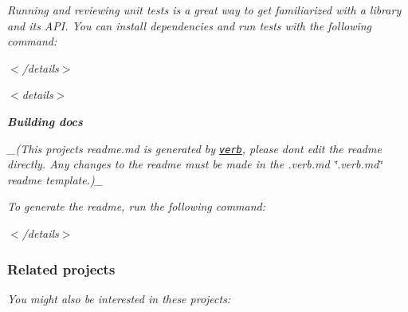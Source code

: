 {\itshape }

{\itshape Running and reviewing unit tests is a great way to get familiarized with a library and its A\+PI. You can install dependencies and run tests with the following command\+:}

{\itshape 
{}
}

{\itshape $<$/details$>$}

{\itshape $<$details$>$ }

{\itshape {\bfseries Building docs}}

{\itshape }

{\itshape \+\_\+(This project\textquotesingle{}s readme.\+md is generated by \href{https://github.com/verbose/verb-generate-readme}{\tt verb}, please don\textquotesingle{}t edit the readme directly. Any changes to the readme must be made in the .verb.\+md \char`\"{}.\+verb.\+md\char`\"{} readme template.)\+\_\+}

{\itshape To generate the readme, run the following command\+:}

{\itshape 
{}
}

{\itshape $<$/details$>$}

{\itshape \subsubsection*{Related projects}}

{\itshape }

{\itshape You might also be interested in these projects\+:}

